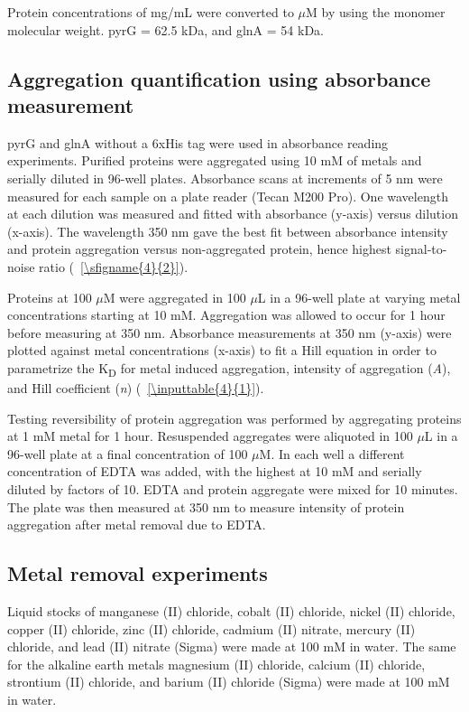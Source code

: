 \documentclass[../main/main]{subfiles}
\begin{document}
Protein concentrations of mg/mL were converted to $\mu$M by using the monomer molecular weight. pyrG = 62.5 kDa, and glnA = 54 kDa.

\subsection*{Aggregation quantification using absorbance measurement}
pyrG and glnA without a 6xHis tag were used in absorbance reading experiments. Purified proteins were aggregated using 10 mM of metals and serially diluted in 96-well plates. Absorbance scans at increments of 5 nm were measured for each sample on a plate reader (Tecan M200 Pro). One wavelength at each dilution was measured and fitted with absorbance (y-axis) versus dilution (x-axis). The wavelength 350 nm gave the best fit between absorbance intensity and protein aggregation versus non-aggregated protein, hence highest signal-to-noise ratio (\sFIGURE~\ref{\sfigname{4}{2}}).

Proteins at 100 $\mu$M were aggregated in 100 $\mu$L in a 96-well plate at varying metal concentrations starting at 10 mM. Aggregation was allowed to occur for 1 hour before measuring at 350 nm. Absorbance measurements at 350 nm (y-axis) were plotted against metal concentrations (x-axis) to fit a Hill equation in order to parametrize the K\textsubscript{D} for metal induced aggregation, intensity of aggregation (\textit{A}), and Hill coefficient (\textit{n}) (\TABLE~\ref{\inputtable{4}{1}}).

Testing reversibility of protein aggregation was performed by aggregating proteins at 1 mM metal for 1 hour. Resuspended aggregates were aliquoted in 100 $\mu$L in a 96-well plate at a final concentration of 100 $\mu$M. In each well a different concentration of EDTA was added, with the highest at 10 mM and serially diluted by factors of 10. EDTA and protein aggregate were mixed for 10 minutes. The plate was then measured at 350 nm to measure intensity of protein aggregation after metal removal due to EDTA.

\subsection*{Metal removal experiments}
Liquid stocks of manganese (II) chloride, cobalt (II) chloride, nickel (II) chloride, copper (II) chloride, zinc (II) chloride, cadmium (II) nitrate, mercury (II) chloride, and lead (II) nitrate (Sigma) were made at 100 mM in water. The same for the alkaline earth metals magnesium (II) chloride, calcium (II) chloride, strontium (II) chloride, and barium (II) chloride (Sigma) were made at 100 mM in water.
\end{document}
